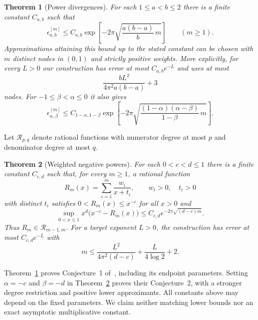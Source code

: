 \documentclass[11pt]{article}
\newtheorem{theorem}{Theorem}[section]
\numberwithin{equation}{section}
\newcommand{\cR}{\mathcal R}
\begin{document}
\begin{theorem}[Power divergences]\label{thm:C1}
For each $1\le a<b\le2$ there is a finite constant $C_{a,b}$ such that
\begin{equation}\label{eq:C1}
 \epsilon^{[m]}_{a,b}\le C_{a,b}
       \exp\left[-2\pi\sqrt{\frac{a(b-a)}b\,m}\right]
       \qquad(m\ge1).
\end{equation}
Approximations attaining this bound up to the stated constant can be
chosen with $m$ distinct nodes in $(0,1)$ and strictly positive weights.
More explicitly, for every $L>0$ our construction has error at most
$C_{a,b}e^{-L}$ and uses at most
\begin{equation}\label{eq:C1count}
 \frac{bL^2}{4\pi^2a(b-a)}+3
\end{equation}
nodes. For $-1\le\beta<\alpha\le0$ it also gives
\begin{equation}\label{eq:C1negative}
 \epsilon^{[m]}_{\alpha,\beta}\le C_{1-\alpha,1-\beta}
  \exp\left[-2\pi\sqrt{\frac{(1-\alpha)(\alpha-\beta)}{1-\beta}\,m}\right].
\end{equation}
\end{theorem}

Let $\cR_{p,q}$ denote rational functions with numerator degree at most
$p$ and denominator degree at most $q$.

\begin{theorem}[Weighted negative powers]\label{thm:C2}
For each $0<c<d\le1$ there is a finite constant $C_{c,d}$ such that,
for every $m\ge1$, a rational function
\begin{equation}\label{eq:positiveStieltjes}
 R_m(x)=\sum_{i=1}^m\frac{w_i}{x+t_i},\qquad w_i>0,\quad t_i>0
\end{equation}
with distinct $t_i$ satisfies $0<R_m(x)\le x^{-c}$ for all $x>0$ and
\begin{equation}\label{eq:C2}
 \sup_{0<x\le1}x^d\bigl(x^{-c}-R_m(x)\bigr)
       \le C_{c,d}e^{-2\pi\sqrt{(d-c)m}}.
\end{equation}
Thus $R_m\in\cR_{m-1,m}$. For a target exponent $L>0$, the construction
has error at most $C_{c,d}e^{-L}$ with
\begin{equation}\label{eq:C2count}
 m\le\frac{L^2}{4\pi^2(d-c)}+\frac{L}{4\log2}+2.
\end{equation}
\end{theorem}

Theorem~\ref{thm:C1} proves Conjecture~1 of~\cite{FF}, including its
endpoint parameters. Setting $\alpha=-c$ and $\beta=-d$ in
Theorem~\ref{thm:C2} proves their Conjecture~2, with a stronger degree
restriction and positive lower approximants. All constants above may
depend on the fixed parameters. We claim neither matching lower bounds
nor an exact asymptotic multiplicative constant.
\end{document}
